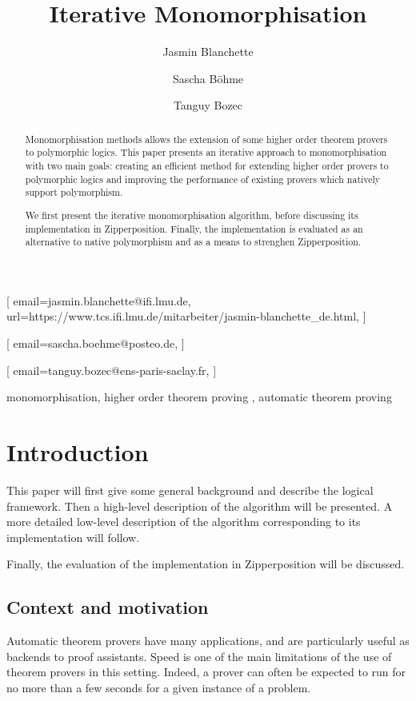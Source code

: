 \documentclass[]{ceurart}
\begin{document}


\title{Iterative Monomorphisation}

\author[1]{Jasmin Blanchette}[%
email=jasmin.blanchette@ifi.lmu.de,
url=https://www.tcs.ifi.lmu.de/mitarbeiter/jasmin-blanchette_de.html,
]
\address[1]{lmu}
\author{Sascha B\"ohme}[%
email=sascha.boehme@posteo.de,
]
\author[1,2]{Tanguy Bozec}[%
email=tanguy.bozec@ens-paris-saclay.fr,
]
\address[2]{ens paris-saclay}


\begin{abstract}
   Monomorphisation methods allows the extension of some higher order theorem provers to polymorphic logics. This paper presents an iterative approach to monomorphisation with two main goals: creating an efficient method for extending higher order provers to polymorphic logics and improving the performance of existing provers which natively support polymorphism.
   
   We first present the iterative monomorphisation algorithm, before discussing its implementation in Zipperposition. Finally, the implementation is evaluated as an alternative to native polymorphism and as a means to strenghen Zipperposition.
\end{abstract}

\begin{keywords}
   monomorphisation\sep
   higher order theorem proving \sep
   automatic theorem proving
\end{keywords}

\maketitle

\section{Introduction}

This paper will first give some general background and describe the logical framework. Then a high-level description of the algorithm will be presented. A more detailed low-level description of the algorithm corresponding to its implementation will follow.

Finally, the evaluation of the implementation in Zipperposition will be discussed.

\subsection{Context and motivation}
Automatic theorem provers have many applications, and are particularly useful as backends to proof assistants. Speed is one of the main limitations of the use of theorem provers in this setting. Indeed, a prover can often be expected to run for no more than a few seconds for a given instance of a problem.
\end{document}
